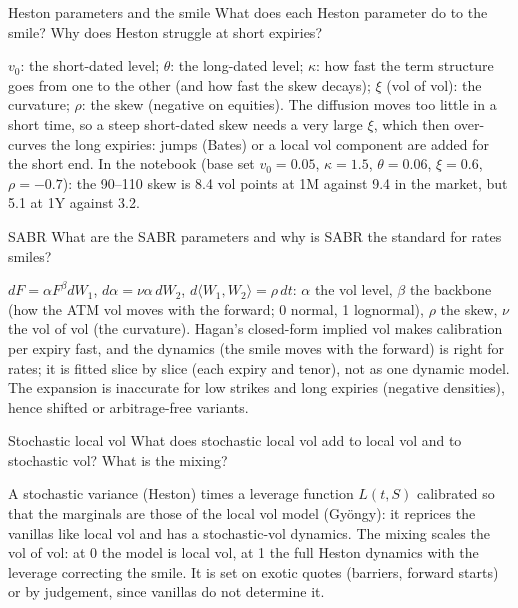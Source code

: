 \begin{question}{\Theory \Practice {}}{Heston parameters and the smile}
What does each Heston parameter do to the smile? Why does Heston struggle at short expiries?
\end{question}
\begin{answer}
$v_0$: the short-dated level; $\theta$: the long-dated level; $\kappa$: how fast the term structure goes from one to the
other (and how fast the skew decays); $\xi$ (vol of vol): the curvature; $\rho$: the skew (negative on equities). The
diffusion moves too little in a short time, so a steep short-dated skew needs a very large $\xi$, which then
over-curves the long expiries: jumps (Bates) or a local vol component are added for the short end. In the notebook
(base set $v_0 = 0.05$, $\kappa = 1.5$, $\theta = 0.06$, $\xi = 0.6$, $\rho = -0.7$): the 90--110 skew is 8.4 vol points at 1M
against 9.4 in the market, but 5.1 at 1Y against 3.2.
\end{answer}

\begin{question}{\Theory {}}{SABR}
What are the SABR parameters and why is SABR the standard for rates smiles?
\end{question}
\begin{answer}
$dF = \alpha F^\beta dW_1$, $d\alpha = \nu\alpha\,dW_2$, $d\langle W_1, W_2\rangle = \rho\,dt$: $\alpha$ the vol level, $\beta$
the backbone (how the ATM vol moves with the forward; 0 normal, 1 lognormal), $\rho$ the skew, $\nu$ the vol of vol
(the curvature). Hagan's closed-form implied vol makes calibration per expiry fast, and the dynamics (the smile moves
with the forward) is right for rates; it is fitted slice by slice (each expiry and tenor), not as one dynamic model.
The expansion is inaccurate for low strikes and long expiries (negative densities), hence shifted or arbitrage-free
variants.
\end{answer}

\begin{question}{\Theory {}}{Stochastic local vol}
What does stochastic local vol add to local vol and to stochastic vol? What is the mixing?
\end{question}
\begin{answer}
A stochastic variance (Heston) times a leverage function $L(t, S)$ calibrated so that the marginals are those of the
local vol model (Gy\"ongy): it reprices the vanillas like local vol and has a stochastic-vol dynamics. The mixing scales
the vol of vol: at 0 the model is local vol, at 1 the full Heston dynamics with the leverage correcting the smile. It is
set on exotic quotes (barriers, forward starts) or by judgement, since vanillas do not determine it.
\end{answer}

